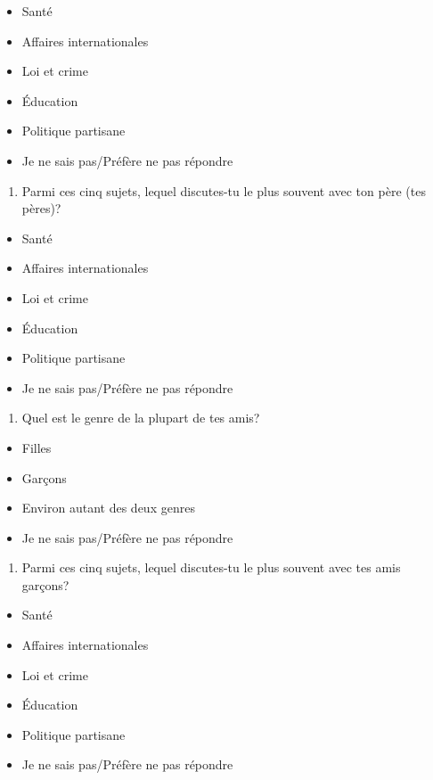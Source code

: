 \documentclass[
  letterpaper,
  DIV=11,
  numbers=noendperiod]{scrreprt}
\providecommand{\tightlist}{%
  \setlength{\itemsep}{0pt}\setlength{\parskip}{0pt}}\usepackage{longtable,booktabs,array}
\begin{document}
\begin{itemize}
\tightlist
\item
  Santé
\item
  Affaires internationales
\item
  Loi et crime
\item
  Éducation
\item
  Politique partisane
\item
  Je ne sais pas/Préfère ne pas répondre
\end{itemize}

\begin{enumerate}
\def\labelenumi{\arabic{enumi}.}
\setcounter{enumi}{8}
\tightlist
\item
  Parmi ces cinq sujets, lequel discutes-tu le plus souvent avec ton
  père (tes pères)?
\end{enumerate}

\begin{itemize}
\tightlist
\item
  Santé
\item
  Affaires internationales
\item
  Loi et crime
\item
  Éducation
\item
  Politique partisane
\item
  Je ne sais pas/Préfère ne pas répondre
\end{itemize}

\begin{enumerate}
\def\labelenumi{\arabic{enumi}.}
\setcounter{enumi}{9}
\tightlist
\item
  Quel est le genre de la plupart de tes amis?
\end{enumerate}

\begin{itemize}
\tightlist
\item
  Filles
\item
  Garçons
\item
  Environ autant des deux genres
\item
  Je ne sais pas/Préfère ne pas répondre
\end{itemize}

\begin{enumerate}
\def\labelenumi{\arabic{enumi}.}
\setcounter{enumi}{10}
\tightlist
\item
  Parmi ces cinq sujets, lequel discutes-tu le plus souvent avec tes
  amis garçons?
\end{enumerate}

\begin{itemize}
\tightlist
\item
  Santé
\item
  Affaires internationales
\item
  Loi et crime
\item
  Éducation
\item
  Politique partisane
\item
  Je ne sais pas/Préfère ne pas répondre
\end{itemize}
\end{document}
